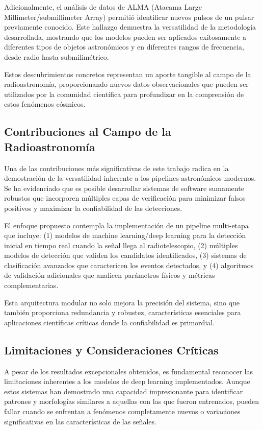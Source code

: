 Adicionalmente, el análisis de datos de ALMA (Atacama Large Millimeter/submillimeter Array) permitió identificar nuevos pulsos de un pulsar previamente conocido. Este hallazgo demuestra la versatilidad de la metodología desarrollada, mostrando que los modelos pueden ser aplicados exitosamente a diferentes tipos de objetos astronómicos y en diferentes rangos de frecuencia, desde radio hasta submilimétrico.

Estos descubrimientos concretos representan un aporte tangible al campo de la radioastronomía, proporcionando nuevos datos observacionales que pueden ser utilizados por la comunidad científica para profundizar en la comprensión de estos fenómenos cósmicos.

\subsection{Contribuciones al Campo de la Radioastronomía}

Una de las contribuciones más significativas de este trabajo radica en la demostración de la versatilidad inherente a los pipelines astronómicos modernos. Se ha evidenciado que es posible desarrollar sistemas de software sumamente robustos que incorporen múltiples capas de verificación para minimizar falsos positivos y maximizar la confiabilidad de las detecciones.

El enfoque propuesto contempla la implementación de un pipeline multi-etapa que incluye: (1) modelos de machine learning/deep learning para la detección inicial en tiempo real cuando la señal llega al radiotelescopio, (2) múltiples modelos de detección que validen los candidatos identificados, (3) sistemas de clasificación avanzados que caractericen los eventos detectados, y (4) algoritmos de validación adicionales que analicen parámetros físicos y métricas complementarias.

Esta arquitectura modular no solo mejora la precisión del sistema, sino que también proporciona redundancia y robustez, características esenciales para aplicaciones científicas críticas donde la confiabilidad es primordial.

\subsection{Limitaciones y Consideraciones Críticas}

A pesar de los resultados excepcionales obtenidos, es fundamental reconocer las limitaciones inherentes a los modelos de deep learning implementados. Aunque estos sistemas han demostrado una capacidad impresionante para identificar patrones y morfologías similares a aquellas con las que fueron entrenados, pueden fallar cuando se enfrentan a fenómenos completamente nuevos o variaciones significativas en las características de las señales.

